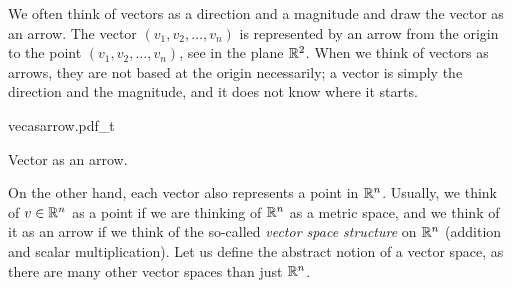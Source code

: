 We often think of vectors as a direction and a magnitude and draw the
vector as an arrow.  The vector $(v_1,v_2,\ldots,v_n)$ is represented
by an arrow from the origin to the point $(v_1,v_2,\ldots,v_n)$, see
 in the plane ${\mathbb{R}}^2$.
When we think of vectors as arrows, they are
not based at the origin necessarily; a vector is simply the direction and
the magnitude, and it does not know where it starts.
\begin{myfigureht}
{vecasarrow.pdf_t}
\caption{Vector as an arrow.\label{fig:vecasarrow}}
\end{myfigureht}

On the other hand, each
vector also represents a point in ${\mathbb{R}}^n$.  Usually, we think of $v \in {\mathbb{R}}^n$
as a point if we are thinking of ${\mathbb{R}}^n$ as a metric space, and we think of
it as an arrow if we think of the so-called \emph{vector space structure} on
${\mathbb{R}}^n$ (addition and scalar multiplication).
Let us define the abstract notion of a vector space, as there
are many other vector spaces than just ${\mathbb{R}}^n$.

